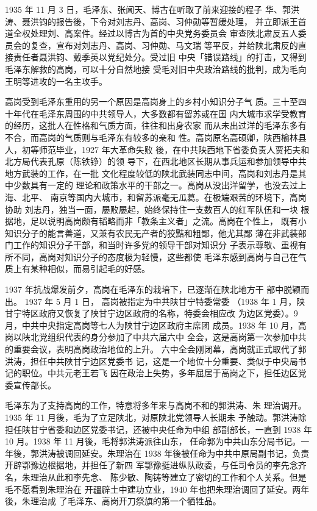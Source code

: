 1935 年 11 月 3 日，毛泽东、张闻天、博古在听取了前来迎接的程子
华、郭洪涛、聂洪钧的报告後，下令对刘志丹、高岗、习仲勋等暂缓处理，
并立即派王首道全权处理刘、高案件。经过以博古为首的中央党务委员会
审查陕北肃反五人委员会的复查，宣布对刘志丹、高岗、习仲勋、马文瑞
等平反，并给陕北肃反的直接责任者聂洪钧、戴季英以党纪处分。受过旧
中央「错误路线」的打击，又得到毛泽东解救的高岗，可以十分自然地接
受毛对旧中央政治路线的批判，成为毛向王明等进攻的一名主攻手。

高岗受到毛泽东重用的另一个原因是高岗身上的乡村小知识分子气
质。三十至四十年代在毛泽东周围的中共领导人，大多数都有留苏或在国
内大城市求学受教育的经历，这批人在性格和气质方面，往往和出身农家
而从未出过洋的毛泽东多有不合，而高岗的气质则与毛泽东有较多的亲和
性。高岗原名高硕卿，陕西榆林县人，初等师范毕业，1927 年大革命失败
後，在中共陕西地下省委负责人贾拓夫和北方局代表孔原（陈铁铮）的领
导下，在西北地区长期从事兵运和参加领导中共地方武装的工作，在一批
文化程度较低的陕北武装同志中间，高岗和刘志丹是其中少数具有一定的
理论和政策水平的干部之一。高岗从没出洋留学，也没去过上海、北平、
南京等国内大城市，和留苏派毫无瓜葛。在极端艰苦的环境下，高岗协助
刘志丹，独当一面，屡败屡起，始终保持住一支数百人的红军队伍和一块
根据地，足以说明高岗颇有韬略而非「教条主义者」之流。高岗在个性上，
既有小知识分子的能言善道，又兼有农民无产者的狡黠和粗鄙，他尤其鄙
薄在非武装部门工作的知识分子干部，和当时许多党的领导干部对知识分
子表示尊敬、重视有所不同，高岗对知识分子的态度极为轻慢，这些都使
毛泽东感到高岗与自己在气质上有某种相似，而易引起毛的好感。

1937 年抗战爆发前夕，高岗在毛泽东的栽培下，已逐渐在陕北地方干
部中脱颖而出。
1937 年 5 月 1 日，
高岗被指定为中共陕甘宁特委常委
（1938
年 1 月，陕甘宁特区政府又恢复了陕甘宁边区政府的名称，特委会相应改
为边区党委）。9 月，中共中央指定高岗等七人为陕甘宁边区政府主席团
成员。1938 年 10 月，高岗以陕北党组织代表的身分参加了中共六届六中
全会，这是高岗第一次参加中共的重要会议，表明高岗政治地位的上升。
六中全会刚闭幕，高岗就正式取代了郭洪涛，担任中共陕甘宁边区党委书
记，这是一个地位十分重要、类似于中央局书记的职位。中共元老王若飞
因在政治上失势，多年屈居于高岗之下，担任边区党委宣传部长。

毛泽东为了支持高岗的工作，特意将多年来与高岗不和的郭洪涛、朱
理治调开。1935 年 11 月後，毛为了立足陕北，对原陕北党领导人长期未
予触动。郭洪涛除担任陕甘宁省委和边区党委书记，还被中央任命为中组
部副部长，一直到 1938 年 10 月。1938 年 11 月後，毛将郭洪涛派往山东，
任命郭为中共山东分局书记。一年後，郭洪涛被调回延安。朱理治在 1938
年後被任命为中共中原局副书记，负责开辟鄂豫边根据地，并担任了新四
军鄂豫挺进纵队政委，与任司令员的李先念齐名，朱理治从此和李先念、
陈少敏、陶铸等建立了密切的工作和个人关系。但是毛不愿看到朱理治在
开疆辟土中建功立业，1940 年也把朱理治调回了延安。两年後，朱理治成
了毛泽东、高岗开刀祭旗的第一个牺牲品。

